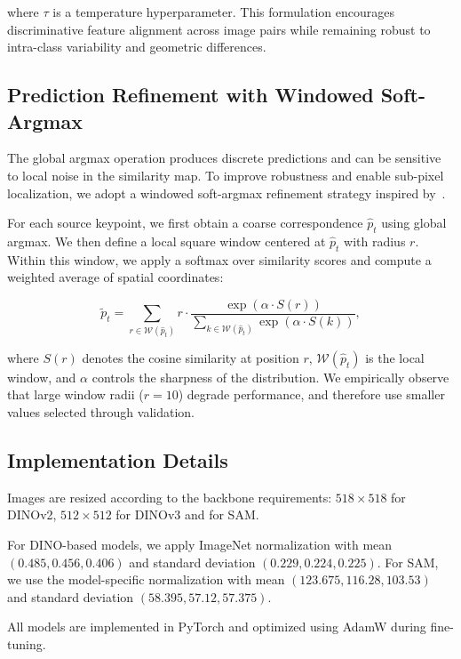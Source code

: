 where $\tau$ is a temperature hyperparameter. This formulation encourages discriminative feature alignment across image pairs while remaining robust
to intra-class variability and geometric differences.


\subsection{Prediction Refinement with Windowed Soft-Argmax}

The global argmax operation produces discrete predictions and can be sensitive to local noise in the similarity map. To improve robustness and enable
sub-pixel localization, we adopt a windowed soft-argmax refinement strategy inspired by~\cite{zhang2024telling}.

For each source keypoint, we first obtain a coarse correspondence $\hat{p}_t$ using global argmax. We then define a local square window centered
at $\hat{p}_t$ with radius $r$. Within this window, we apply a softmax over similarity scores and compute a weighted average of spatial coordinates:

\begin{equation}
    \tilde{p}_t = \sum_{r \in \mathcal{W}(\hat{p}_t)} r \cdot 
    \frac{\exp(\alpha \cdot S(r))}{\sum_{k \in \mathcal{W}(\hat{p}_t)} \exp(\alpha \cdot S(k))},
\label{eq:soft_argmax}
\end{equation}

where $S(r)$ denotes the cosine similarity at position $r$, $\mathcal{W}(\hat{p}_t)$ is the local window, and $\alpha$ controls the sharpness of
the distribution. We empirically observe that large window radii (\eg $r=10$) degrade performance, and therefore use smaller values
selected through validation.


\subsection{Implementation Details}

Images are resized according to the backbone requirements: $518 \times 518$ for DINOv2, $512 \times 512$ for DINOv3 and for SAM.

For DINO-based models, we apply ImageNet normalization with mean $(0.485, 0.456, 0.406)$ and standard deviation $(0.229, 0.224, 0.225)$.
For SAM, we use the model-specific normalization with mean $(123.675, 116.28, 103.53)$ and standard deviation $(58.395, 57.12, 57.375)$.

All models are implemented in PyTorch and optimized using AdamW during fine-tuning.


